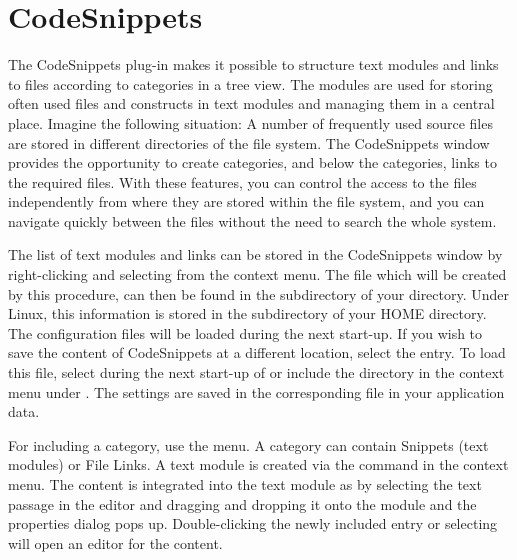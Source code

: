 \section{CodeSnippets}\label{sec:codesnippets}

The CodeSnippets plug-in makes it possible to structure text modules and links to files according to categories in a tree view. The modules are used for storing often used files and constructs in text modules and managing them in a central place. Imagine the following situation: A number of frequently used source files are stored in different directories of the file system. The CodeSnippets window provides the opportunity to create categories, and below the categories, links to the required files. With these features, you can control the access to the files independently from where they are stored within the file system, and you can navigate quickly between the files without the need to search the whole system.


The list of text modules and links can be stored in the CodeSnippets window by right-clicking and selecting  from the context menu. The file  which will be created by this procedure, can then be found in the  subdirectory of your  directory. Under Linux, this information is stored in the  subdirectory of your HOME directory. The \codeblocks configuration files will be loaded during the next start-up. If you wish to save the content of CodeSnippets at a different location, select the  entry. To load this file, select  during the next start-up of \codeblocks or include the directory in the  context menu under . The settings are saved in the corresponding file  in your application data.

For including a category, use the  menu. A category can contain Snippets (text modules) or File Links. A text module is created via the  command in the context menu. The content is integrated into the text module as  by selecting the text passage in the \codeblocks editor and dragging and dropping it onto the module and the properties dialog pops up. Double-clicking the newly included entry or selecting  will open an editor for the content.

